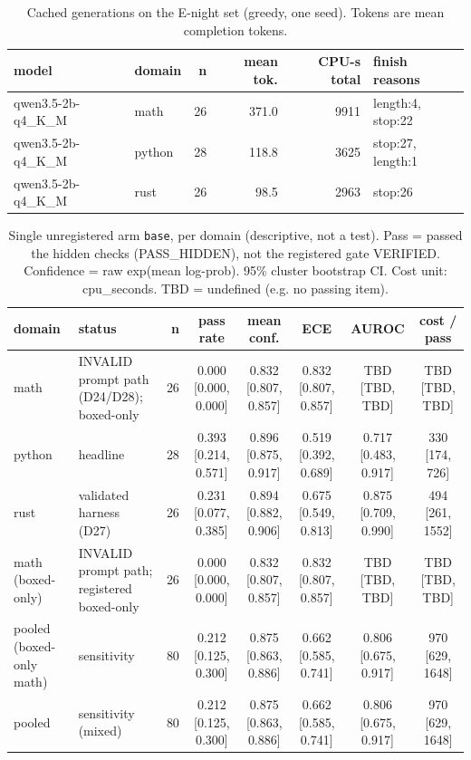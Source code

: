 \begin{table}[t]\centering\small
\caption{Cached generations on the E-night set (greedy, one seed). Tokens are mean completion tokens.}
\begin{tabular}{llrrrl}\toprule
model & domain & n & mean tok. & CPU-s total & finish reasons \\\midrule
qwen3.5-2b-q4\_K\_M & math & 26 & 371.0 & 9911 & length:4, stop:22 \\
qwen3.5-2b-q4\_K\_M & python & 28 & 118.8 & 3625 & stop:27, length:1 \\
qwen3.5-2b-q4\_K\_M & rust & 26 & 98.5 & 2963 & stop:26 \\
\bottomrule\end{tabular}\end{table}

\begin{table}[t]\centering\small
\caption{Single unregistered arm \texttt{base}, per domain (descriptive, not a test). Pass = passed the hidden checks (PASS\_HIDDEN), not the registered gate VERIFIED. Confidence = raw exp(mean log-prob). 95\% cluster bootstrap CI. Cost unit: cpu\_seconds. TBD = undefined (e.g. no passing item).}
\begin{tabular}{p{2.6cm}p{3.0cm}rccccc}\toprule
domain & status & n & pass rate & mean conf. & ECE & AUROC & cost / pass \\\midrule
math & INVALID prompt path (D24/D28); boxed-only & 26 & 0.000 [0.000, 0.000] & 0.832 [0.807, 0.857] & 0.832 [0.807, 0.857] & TBD [TBD, TBD] & TBD [TBD, TBD] \\
python & headline & 28 & 0.393 [0.214, 0.571] & 0.896 [0.875, 0.917] & 0.519 [0.392, 0.689] & 0.717 [0.483, 0.917] & 330 [174, 726] \\
rust & validated harness (D27) & 26 & 0.231 [0.077, 0.385] & 0.894 [0.882, 0.906] & 0.675 [0.549, 0.813] & 0.875 [0.709, 0.990] & 494 [261, 1552] \\
math (boxed-only) & INVALID prompt path; registered boxed-only & 26 & 0.000 [0.000, 0.000] & 0.832 [0.807, 0.857] & 0.832 [0.807, 0.857] & TBD [TBD, TBD] & TBD [TBD, TBD] \\
pooled (boxed-only math) & sensitivity & 80 & 0.212 [0.125, 0.300] & 0.875 [0.863, 0.886] & 0.662 [0.585, 0.741] & 0.806 [0.675, 0.917] & 970 [629, 1648] \\
pooled & sensitivity (mixed) & 80 & 0.212 [0.125, 0.300] & 0.875 [0.863, 0.886] & 0.662 [0.585, 0.741] & 0.806 [0.675, 0.917] & 970 [629, 1648] \\
\bottomrule\end{tabular}\end{table}

